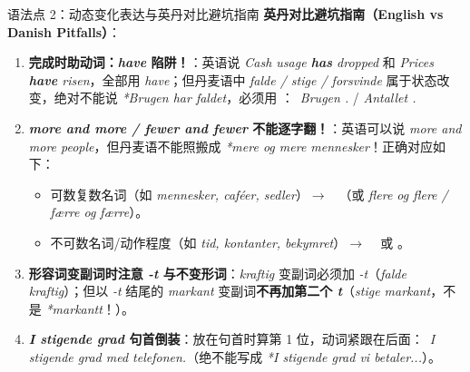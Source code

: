 \begin{grammatikbox}{语法点 2：动态变化表达与英丹对比避坑指南}
\textbf{英丹对比避坑指南（English vs Danish Pitfalls）}：
\begin{enumerate}
  \item \textbf{完成时助动词：\textit{have} 陷阱！}：英语说 \textit{Cash usage \textbf{has} dropped} 和 \textit{Prices \textbf{have} risen}，全部用 \textit{have}；但丹麦语中 \textit{falde / stige / forsvinde} 属于状态改变，绝对不能说 \textit{*Brugen har faldet}，必须用 ：\ \textit{Brugen .} / \textit{Antallet .}
  \item \textbf{\textit{more and more / fewer and fewer} 不能逐字翻！}：英语可以说 \textit{more and more people}，但丹麦语不能照搬成 \textit{*mere og mere mennesker}！正确对应如下：
    \begin{itemize}
      \item 可数复数名词（如 \textit{mennesker, caféer, sedler}）$\rightarrow$ \ （或 \textit{flere og flere / færre og færre}）。
      \item 不可数名词/动作程度（如 \textit{tid, kontanter, bekymret}）$\rightarrow$ \  或 。
    \end{itemize}
  \item \textbf{形容词变副词时注意 \textit{-t} 与不变形词}：\textit{kraftig} 变副词必须加 \textit{-t}（\textit{falde kraftig}）；但以 \textit{-t} 结尾的 \textit{markant} 变副词\textbf{不再加第二个 \textit{t}}（\textit{stige markant}，不是 \textit{*markantt}！）。
  \item \textbf{\textit{I stigende grad} 句首倒装}：放在句首时算第 1 位，动词紧跟在后面：\ \textit{I stigende grad  med telefonen.}（绝不能写成 \textit{*I stigende grad vi betaler...}）。
\end{enumerate}
\end{grammatikbox}


